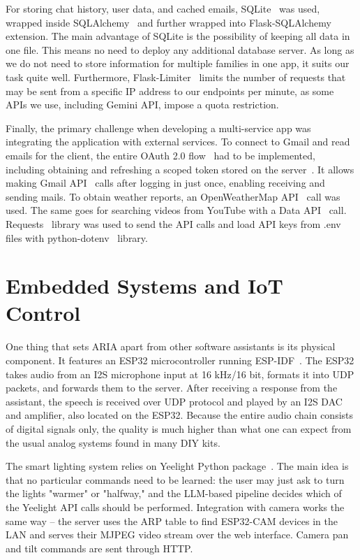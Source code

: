 For storing chat history, user data, and cached emails, SQLite~\cite{sqlite} was used, wrapped inside SQLAlchemy~\cite{sqlalchemy} and further wrapped into Flask-SQLAlchemy~\cite{flask-sqlalchemy} extension. The main advantage of SQLite is the possibility of keeping all data in one file. This means no need to deploy any additional database server. As long as we do not need to store information for multiple families in one app, it suits our task quite well. Furthermore, Flask-Limiter~\cite{flask-limiter} limits the number of requests that may be sent from a specific IP address to our endpoints per minute, as some APIs we use, including Gemini API, impose a quota restriction.

Finally, the primary challenge when developing a multi-service app was integrating the application with external services. To connect to Gmail and read emails for the client, the entire OAuth 2.0 flow~\cite{rfc6749} had to be implemented, including obtaining and refreshing a scoped token stored on the server~\cite{google-oauth}. It allows making Gmail API~\cite{gmail-api} calls after logging in just once, enabling receiving and sending mails. To obtain weather reports, an OpenWeatherMap API~\cite{openweather} call was used. The same goes for searching videos from YouTube with a Data API~\cite{youtube-api} call. Requests~\cite{requests} library was used to send the API calls and load API keys from .env files with python-dotenv~\cite{python-dotenv} library.



\section{Embedded Systems and IoT Control}

One thing that sets ARIA apart from other software assistants is its physical component. It features an ESP32 microcontroller running ESP-IDF~\cite{esp-idf}. The ESP32 takes audio from an I2S microphone input at 16 kHz/16 bit, formats it into UDP packets, and forwards them to the server. After receiving a response from the assistant, the speech is received over UDP protocol and played by an I2S DAC and amplifier, also located on the ESP32. Because the entire audio chain consists of digital signals only, the quality is much higher than what one can expect from the usual analog systems found in many DIY kits.

The smart lighting system relies on Yeelight Python package~\cite{yeelight}. The main idea is that no particular commands need to be learned: the user may just ask to turn the lights "warmer" or "halfway," and the LLM-based pipeline decides which of the Yeelight API calls should be performed. Integration with camera works the same way – the server uses the ARP table to find ESP32-CAM devices in the LAN and serves their MJPEG video stream over the web interface. Camera pan and tilt commands are sent through HTTP.



